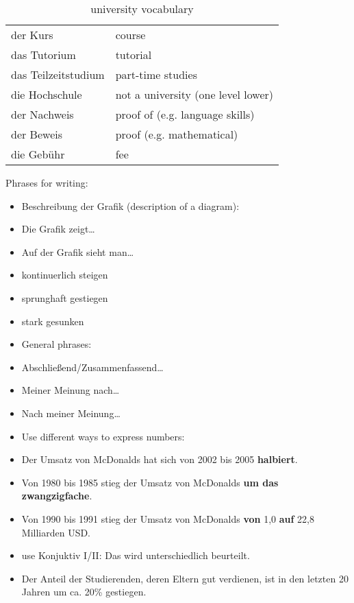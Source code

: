 \documentclass[12pt]{article}
\begin{document}
\begin{table}
\begin{tabular}{l | l}
    der Kurs                & course\\
    das Tutorium            & tutorial\\
    das Teilzeitstudium     & part-time studies\\
    die Hochschule          & not a university (one level lower)\\
    der Nachweis            & proof of (e.g. language skills)\\
    der Beweis              & proof (e.g. mathematical)\\
    die Geb\"uhr            & fee\\
\end{tabular}
\caption{\label{table:uni} university vocabulary}
\end{table}

\myspace{}
Phrases for writing:
\begin{itemize}
    \item[] Beschreibung der Grafik (description of a diagram):
    \item Die Grafik zeigt\dots
    \item Auf der Grafik sieht man\dots
    \item kontinuerlich steigen 
    \item sprunghaft gestiegen
    \item stark gesunken 

    \item[] General phrases:
    \item Abschlie{\ss}end/Zusammenfassend\dots
    \item Meiner Meinung nach\dots
    \item Nach meiner Meinung\dots
    
    \item[] Use different ways to express numbers:
    \item Der Umsatz von McDonalds hat sich von 2002 bis 2005 \textbf{halbiert}. 
    \item Von 1980 bis 1985 stieg der Umsatz von McDonalds \textbf{um das zwangzigfache}. 
    \item Von 1990 bis 1991 stieg der Umsatz von McDonalds \textbf{von} 1,0 \textbf{auf} 22,8 Milliarden USD. 
    \item use Konjuktiv I/II: Das wird unterschiedlich beurteilt.
    \item Der Anteil der Studierenden, deren Eltern gut verdienen, ist in den letzten 20 Jahren um ca. 20\% gestiegen.
\end{itemize}
\end{document}
